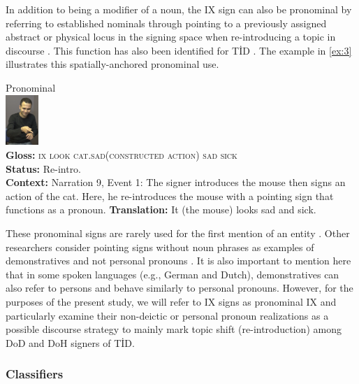 \documentclass[review]{elsarticle} %
\begin{document}
In addition to being a modifier of a noun, the IX sign can also be
pronominal by referring to established nominals through pointing to a
previously assigned abstract or physical locus in the signing space when
re-introducing a topic in discourse \citep{emmorey1996}. This function
has also been identified for TİD \citep{sevinc2006}. The example in
\ref{ex:3} illustrates this spatially-anchored pronominal use.

\ea 
\ea \label{ex:3} Pronominal \\\glll
{} \includegraphics[width=35pt]{pictures/p5.png} {} {} {} {} \\ \textbf{Gloss:} \textsc{ix} \textsc{look} \textsc{cat.sad(constructed action)} \textsc{sad} \textsc{sick} \\ 
\textbf{Status:} Re-intro. \\
\glt \textbf{Context:} Narration 9, Event 1: The signer introduces the mouse then signs an action of the cat. Here, he re-introduces the mouse with a pointing sign that functions as a pronoun.
\glt \textbf{Translation:} It (the mouse) looks sad and sick.
\z \z

These pronominal signs are rarely used for the first mention of an
entity \citep{perniss2015}. Other researchers consider pointing signs
without noun phrases as examples of demonstratives and not personal
pronouns \citep{koulidobrova2016}. It is also important to mention here
that in some spoken languages (e.g., German and Dutch), demonstratives
can also refer to persons \citep{bosch2007} and behave similarly to
personal pronouns. However, for the purposes of the present study, we
will refer to IX signs as pronominal IX and particularly examine their
non-deictic or personal pronoun realizations as a possible discourse
strategy to mainly mark topic shift (re-introduction) among DoD and DoH
signers of TİD.

\hypertarget{classifiers}{%
\subsubsection{Classifiers}\label{classifiers}}
\end{document}
